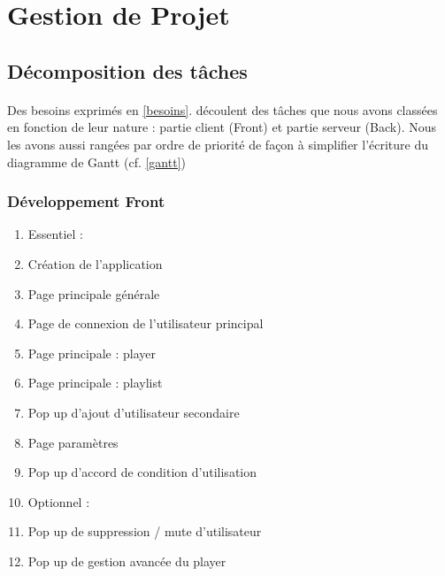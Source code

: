 \documentclass{article}
\begin{document}
		\section{Gestion de Projet}
		\subsection{Décomposition des tâches}
		\paragraph{}
		Des besoins exprimés en \ref{besoins}. découlent des tâches que nous avons classées en fonction de leur nature : partie client (Front) et partie serveur (Back). Nous les avons aussi rangées par ordre de priorité de façon à simplifier l'écriture du diagramme de Gantt (cf. \ref{gantt})
								
		\subsubsection{Développement Front}
		\begin{enumerate}
			\item[]
			      \begin{description}
			      	\item[Essentiel :]
			      \end{description}
			\item Création de l'application\label{creation_item}
			\item Page principale générale\label{general_front_item}
			\item Page de connexion de l'utilisateur principal\label{connexion_front_item}
			\item Page principale : player\label{player_front_item}
			\item Page principale : playlist\label{playlist_front_item}
			\item Pop up d'ajout d'utilisateur secondaire\label{ajout_utilisateur_front_item}
			\item Page paramètres\label{parametres_front_item}
			\item Pop up d'accord de condition d'utilisation\label{conditions_front_item}
			\item[]
			      \begin{description}
			      	\item[Optionnel :]
			      \end{description}
			\item Pop up de suppression / mute d'utilisateur\label{utilisateur_gestion_front_item}
			\item Pop up de gestion avancée du player\label{player_sup_front_item}
		\end{enumerate}
\end{document}

